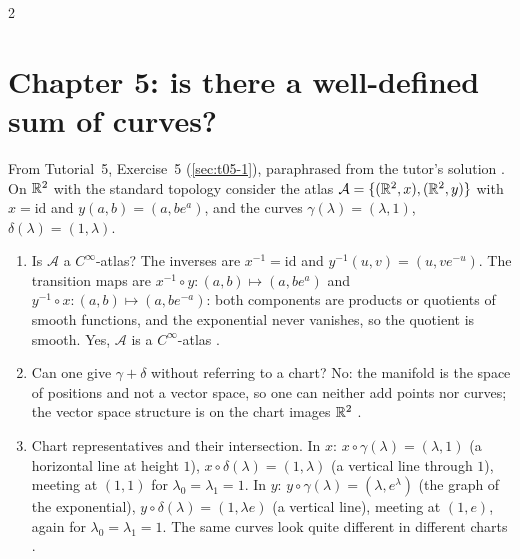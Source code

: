 \begin{paracol}{2}
\section*{Chapter 5: is there a well-defined sum of curves?}\label{app:c05-curves}

From Tutorial~5, Exercise~5 (\cref{sec:t05-1}), paraphrased from the tutor's solution . On $\mathbb{R}^2$ with the standard topology consider the atlas $\mathcal A=\{(\mathbb{R}^2,x),(\mathbb{R}^2,y)\}$ with $x=\mathrm{id}$ and $y(a,b)=(a,be^a)$, and the curves $\gamma(\lambda)=(\lambda,1)$, $\delta(\lambda)=(1,\lambda)$.
\begin{enumerate}
  \item Is $\mathcal A$ a $C^\infty$-atlas? The inverses are $x^{-1}=\mathrm{id}$ and $y^{-1}(u,v)=(u,ve^{-u})$. The transition maps are $x^{-1}\circ y\colon(a,b)\mapsto(a,be^a)$ and $y^{-1}\circ x\colon(a,b)\mapsto(a,be^{-a})$: both components are products or quotients of smooth functions, and the exponential never vanishes, so the quotient is smooth. Yes, $\mathcal A$ is a $C^\infty$-atlas .
  \item Can one give $\gamma+\delta$ without referring to a chart? No: the manifold is the space of positions and not a vector space, so one can neither add points nor curves; the vector space structure is on the chart images $\mathbb{R}^2$ .
  \item Chart representatives and their intersection. In $x$: $x\circ\gamma(\lambda)=(\lambda,1)$ (a horizontal line at height $1$), $x\circ\delta(\lambda)=(1,\lambda)$ (a vertical line through $1$), meeting at $(1,1)$ for $\lambda_0=\lambda_1=1$. In $y$: $y\circ\gamma(\lambda)=(\lambda,e^\lambda)$ (the graph of the exponential), $y\circ\delta(\lambda)=(1,\lambda e)$ (a vertical line), meeting at $(1,e)$, again for $\lambda_0=\lambda_1=1$. The same curves look quite different in different charts
        .

\end{enumerate}
\end{paracol}
